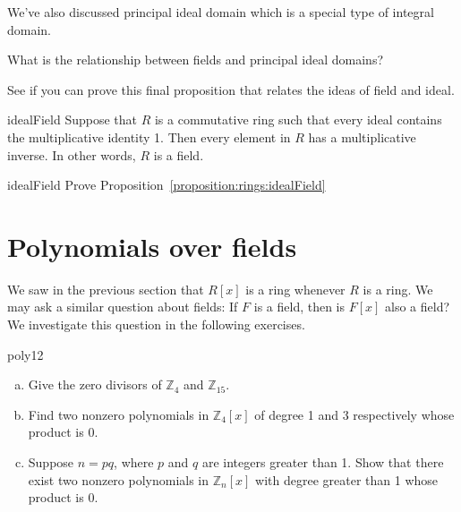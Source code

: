 We've also discussed principal ideal domain which is a special type of integral domain.

\begin{exercise}{}
What is the relationship between fields and principal ideal domains?
\end{exercise}

See if you can prove this final proposition that relates the ideas of field and ideal. 

\begin{prop}{idealField}
Suppose that $R$ is a commutative ring such that every ideal contains the multiplicative identity 1. Then every element in $R$ has a multiplicative inverse. In other words, $R$ is a field.\\
\end{prop}

\begin{exercise}{idealField}
Prove Proposition~\ref{proposition:rings:idealField}
\end{exercise}


\section{Polynomials over fields}
\label{sec:Rings:PolynomialOverFields}

We saw in the previous section that  $R[x]$ is a ring whenever $R$ is a ring. We may ask a similar question about fields: If $F$ is a field, then is $F[x]$ also a field? We investigate this question in the following exercises.


\begin{exercise}{poly12}
\begin{enumerate}[(a)]
\item  Give the zero divisors of ${\mathbb Z}_4$ and ${\mathbb Z}_{15}$.
\item
Find two nonzero polynomials in $\mathbb{Z}_4[x]$ of degree 1 and 3 respectively  whose product is 0.
\item
Suppose $n=pq$, where $p$ and $q$ are integers greater than 1. Show that there exist two nonzero polynomials in $\mathbb{Z}_n[x]$ with degree greater than 1 whose product is 0.
\end{enumerate}
\end{exercise}


